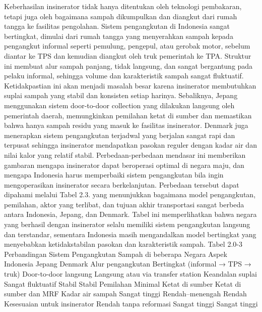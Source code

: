 \documentclass[
  letterpaper,
  DIV=11,
  numbers=noendperiod]{scrreprt}
\begin{document}
Keberhasilan insinerator tidak hanya ditentukan oleh teknologi
pembakaran, tetapi juga oleh bagaimana sampah dikumpulkan dan diangkut
dari rumah tangga ke fasilitas pengolahan. Sistem pengangkutan di
Indonesia sangat bertingkat, dimulai dari rumah tangga yang menyerahkan
sampah kepada pengangkut informal seperti pemulung, pengepul, atau
gerobak motor, sebelum diantar ke TPS dan kemudian diangkut oleh truk
pemerintah ke TPA. Struktur ini membuat alur sampah panjang, tidak
langsung, dan sangat bergantung pada pelaku informal, sehingga volume
dan karakteristik sampah sangat fluktuatif. Ketidakpastian ini akan
menjadi masalah besar karena insinerator membutuhkan suplai sampah yang
stabil dan konsisten setiap harinya. Sebaliknya, Jepang menggunakan
sistem door-to-door collection yang dilakukan langsung oleh pemerintah
daerah, memungkinkan pemilahan ketat di sumber dan memastikan bahwa
hanya sampah residu yang masuk ke fasilitas insinerator. Denmark juga
menerapkan sistem pengangkutan terjadwal yang berjalan sangat rapi dan
terpusat sehingga insinerator mendapatkan pasokan reguler dengan kadar
air dan nilai kalor yang relatif stabil. Perbedaan-perbedaan mendasar
ini memberikan gambaran mengapa insinerator dapat beroperasi optimal di
negara maju, dan mengapa Indonesia harus memperbaiki sistem pengangkutan
bila ingin mengoperasikan insinerator secara berkelanjutan. Perbedaan
tersebut dapat dipahami melalui Tabel 2.3. yang menunjukkan bagaimana
model pengangkutan, pemilahan, aktor yang terlibat, dan tujuan akhir
transportasi sangat berbeda antara Indonesia, Jepang, dan Denmark. Tabel
ini memperlihatkan bahwa negara yang berhasil dengan insinerator selalu
memiliki sistem pengangkutan langsung dan terstandar, sementara
Indonesia masih mengandalkan model bertingkat yang menyebabkan
ketidakstabilan pasokan dan karakteristik sampah. Tabel 2.0-3
Perbandingan Sistem Pengangkutan Sampah di beberapa Negara Aspek
Indonesia Jepang Denmark Alur pengangkutan Bertingkat (informal → TPS →
truk) Door-to-door langsung Langsung atau via transfer station Keandalan
suplai Sangat fluktuatif Stabil Stabil Pemilahan Minimal Ketat di sumber
Ketat di sumber dan MRF Kadar air sampah Sangat tinggi Rendah--menengah
Rendah Kesesuaian untuk insinerator Rendah tanpa reformasi Sangat tinggi
Sangat tinggi
\end{document}
